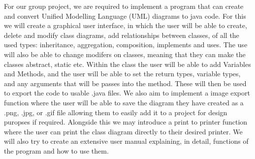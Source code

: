 



For our group project, we are required to implement a program that can create and convert Unified Modelling Language (UML) diagrams to java code. For this we will create a graphical user interface, in which the user will be able to create, delete and modify class diagrams, add relationships between classes, of all the used types: inheritance, aggregation, composition, implements and uses. The use will also be able to change modifers on classes, meaning that they can make the classes abstract, static etc. Within the class the user will be able to add Variables and Methods, and the user will be able to set the return types, variable types, and any arguments that will be passes into the method. These will then be used to export the code to usable .java files. We also aim to implement a image export function where the user will be able to save the diagram they have created as a .png, .jpg, or .gif file allowing them to easily add it to a project for design puropses if required. Alongside this we may introduce a print to printer function where the user can print the class diagram directly to their desired printer. We will also try to create an extensive user manual explaining, in detail, functions of the program and how to use them. 
